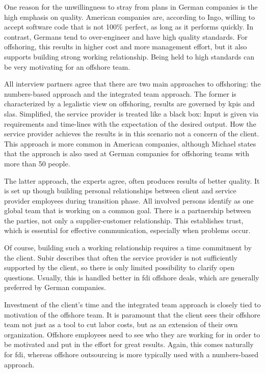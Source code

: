 One reason for the unwillingness to stray from plans in German companies is the high emphasis on quality. American companies are, according to Ingo, willing to accept software code that is not 100\% perfect, as long as it performs quickly. In contrast, Germans tend to over-engineer and have high quality standards. For offshoring, this results in higher cost and more management effort, but it also supports building strong working relationship. Being held to high standards can be very motivating for an offshore team.

All interview partners agree that there are two main approaches to offshoring: the numbers-based approach and the integrated team approach. The former is characterized by a legalistic view on offshoring, results are governed by \glspl{kpi} and \glspl{sla}. Simplified, the service provider is treated like a black box: Input is given via requirements and time-lines with the expectation of the desired output. How the service provider achieves the results is in this scenario not a concern of the client. This approach is more common in American companies, although Michael states that the approach is also used at German companies for offshoring teams with more than 50 people.

The latter approach, the experts agree, often produces results of better quality. It is set up though building personal relationships between client and service provider employees during transition phase. All involved persons identify as one global team that is working on a common goal. There is a partnership between the parties, not only a supplier-customer relationship. This establishes trust, which is essential for effective communication, especially when problems occur.

Of course, building such a working relationship requires a time commitment by the client. Subir describes that often the service provider is not sufficiently supported by the client, so there is only limited possibility to clarify open questions. Usually, this is handled better in \gls{fdi} offshore deals, which are generally preferred by German companies.

Investment of the client's time and the integrated team approach is closely tied to motivation of the offshore team. It is paramount that the client sees their offshore team not just as a tool to cut labor costs, but as an extension of their own organization. Offshore employees need to see who they are working for in order to be motivated and put in the effort for great results. Again, this comes naturally for \gls{fdi}, whereas offshore outsourcing is more typically used with a numbers-based approach.


